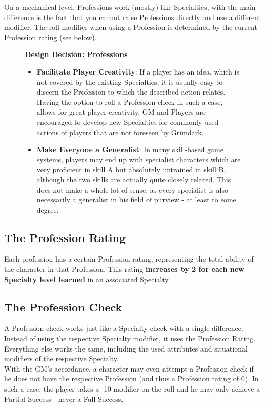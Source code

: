 On a mechanical level, Professions work (mostly) like Specialties, with the main difference is the fact that you cannot raise Professions directly and use a different modifier.
The roll modifier when using a Profession is determined by the current Profession rating (see below).

\begin{figure}[hb]
	\begin{DndReadAloud}
	\textbf{Design Decision: Professions}
	\begin{itemize}
		\item \textbf{Facilitate Player Creativity}: If a player has an idea, which is not covered by the existing Specialties, it is usually easy to discern the Profession to which the described action relates. Having the option to roll a Profession check in such a case, allows for great player creativity. GM and Players are encouraged to develop new Specialties for commonly used actions of players that are not foreseen by Grimdark.
		\item \textbf{Make Everyone a Generalist}: In many skill-based game systems, players may end up with specialist characters which are very proficient in skill A but absolutely untrained in skill B, although the two skills are actually quite closely related. This does not make a whole lot of sense, as every specialist is also necessarily a generalist in his field of purview - at least to some degree.
		\end{itemize}
	\end{DndReadAloud}
\end{figure}

\subsection{The Profession Rating}
Each profession has a certain Profession rating, representing the total ability of the character in that Profession. 
This rating \textbf{increases by 2 for each new Specialty level learned} in an associated Specialty.

\subsection{The Profession Check}
A Profession check works just like a Specialty check with a single difference.
Instead of using the respective Specialty modifier, it uses the Profession Rating.
Everything else works the same, including the used attributes and situational modifiers of the respective Specialty.\\
With the GM's accordance, a character may even attempt a Profession check if he does not have the respective Profession (and thus a Profession rating of 0).
In such a case, the player takes a -10 modifier on the roll and he may only achieve a Partial Success - never a Full Success.

